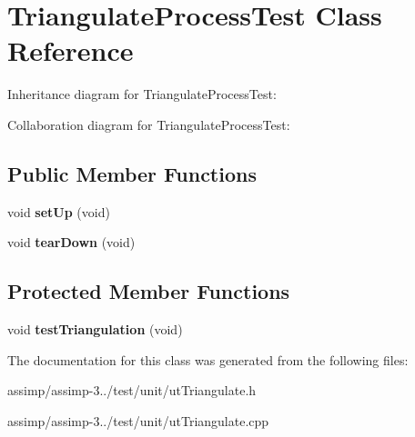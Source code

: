 \hypertarget{class_triangulate_process_test}{\section{Triangulate\+Process\+Test Class Reference}
\label{class_triangulate_process_test}
}


Inheritance diagram for Triangulate\+Process\+Test\+:


Collaboration diagram for Triangulate\+Process\+Test\+:
\subsection*{Public Member Functions}
\begin{DoxyCompactItemize}
\item 
\hypertarget{class_triangulate_process_test_a75e7ae3c671095cac32bace9a5cd0cd3}{void {\bfseries set\+Up} (void)}\label{class_triangulate_process_test_a75e7ae3c671095cac32bace9a5cd0cd3}

\item 
\hypertarget{class_triangulate_process_test_a29bf70797cf24845a4573ba185b6cb58}{void {\bfseries tear\+Down} (void)}\label{class_triangulate_process_test_a29bf70797cf24845a4573ba185b6cb58}

\end{DoxyCompactItemize}
\subsection*{Protected Member Functions}
\begin{DoxyCompactItemize}
\item 
\hypertarget{class_triangulate_process_test_ae863fa58946d0b8a7389ca35cc6634d0}{void {\bfseries test\+Triangulation} (void)}\label{class_triangulate_process_test_ae863fa58946d0b8a7389ca35cc6634d0}

\end{DoxyCompactItemize}


The documentation for this class was generated from the following files\+:\begin{DoxyCompactItemize}
\item 
assimp/assimp-\/3../test/unit/ut\+Triangulate.\+h\item 
assimp/assimp-\/3../test/unit/ut\+Triangulate.\+cpp\end{DoxyCompactItemize}
